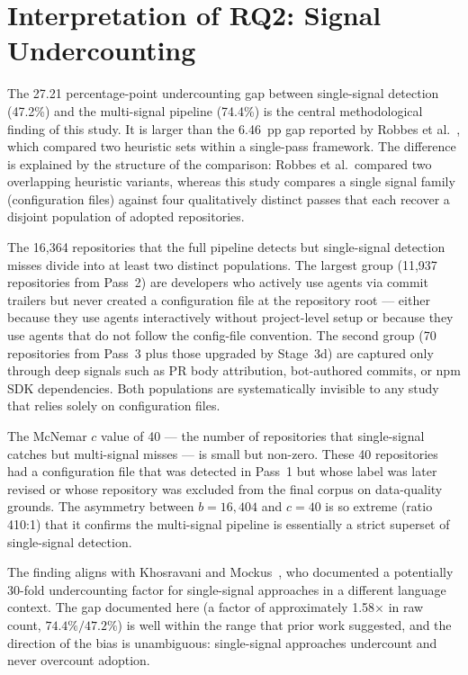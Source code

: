 \section{Interpretation of RQ2: Signal Undercounting}
\label{sec:disc:rq2}

The 27.21 percentage-point undercounting gap between single-signal detection (47.2\%) and the multi-signal pipeline (74.4\%) is the central methodological finding of this study. It is larger than the 6.46~pp gap reported by Robbes et al.~\cite{robbesAgenticMuch2026}, which compared two heuristic sets within a single-pass framework. The difference is explained by the structure of the comparison: Robbes et al.\ compared two overlapping heuristic variants, whereas this study compares a single signal family (configuration files) against four qualitatively distinct passes that each recover a disjoint population of adopted repositories.

The 16,364 repositories that the full pipeline detects but single-signal detection misses divide into at least two distinct populations. The largest group (11,937 repositories from Pass~2) are developers who actively use agents via commit trailers but never created a configuration file at the repository root --- either because they use agents interactively without project-level setup or because they use agents that do not follow the config-file convention. The second group (70 repositories from Pass~3 plus those upgraded by Stage~3d) are captured only through deep signals such as PR body attribution, bot-authored commits, or npm SDK dependencies. Both populations are systematically invisible to any study that relies solely on configuration files.

The McNemar $c$ value of 40 --- the number of repositories that single-signal catches but multi-signal misses --- is small but non-zero. These 40 repositories had a configuration file that was detected in Pass~1 but whose label was later revised or whose repository was excluded from the final corpus on data-quality grounds. The asymmetry between $b = 16{,}404$ and $c = 40$ is so extreme (ratio 410:1) that it confirms the multi-signal pipeline is essentially a strict superset of single-signal detection.

The finding aligns with Khosravani and Mockus~\cite{khosravani2026}, who documented a potentially 30-fold undercounting factor for single-signal approaches in a different language context. The gap documented here (a factor of approximately 1.58$\times$ in raw count, $74.4\% / 47.2\%$) is well within the range that prior work suggested, and the direction of the bias is unambiguous: single-signal approaches undercount and never overcount adoption.

